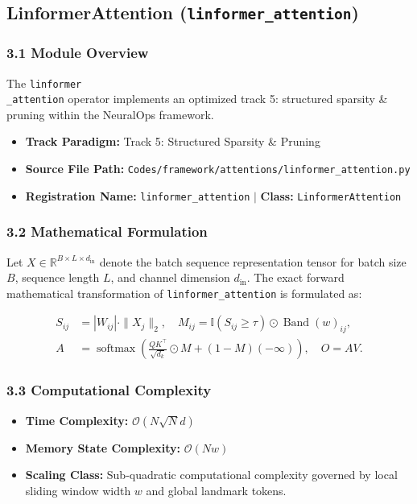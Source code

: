 \subsection{LinformerAttention (\texttt{linformer\_attention})}
\label{sec:app_module_linformer_attention}

\subsubsection*{3.1 Module Overview}
The \texttt{linformer\\_attention} operator implements an optimized track 5: structured sparsity \& pruning within the NeuralOps framework.
\begin{itemize}
    \item \textbf{Track Paradigm:} Track 5: Structured Sparsity & Pruning
    \item \textbf{Source File Path:} \texttt{Codes/framework/attentions/linformer\_attention.py}
    \item \textbf{Registration Name:} \texttt{linformer\_attention} $\mid$ \textbf{Class:} \texttt{LinformerAttention}
\end{itemize}

\subsubsection*{3.2 Mathematical Formulation}
Let $X \in \mathbb{R}^{B \times L \times d_{\text{in}}}$ denote the batch sequence representation tensor for batch size $B$, sequence length $L$, and channel dimension $d_{\text{in}}$. The exact forward mathematical transformation of \texttt{linformer\_attention} is formulated as:

\begin{align}
S_{ij} &= |W_{ij}| \cdot \|X_j\|_2, \quad M_{ij} = \mathbb{I}(S_{ij} \ge \tau) \odot \operatorname{Band}(w)_{ij}, \\
A &= \operatorname{softmax}\left(\frac{Q K^\top}{\sqrt{d_k}} \odot M + (1 - M)(-\infty)\right), \quad O = A V.
\end{align}


\subsubsection*{3.3 Computational Complexity}
\begin{itemize}
    \item \textbf{Time Complexity:} $\mathcal{O}(N \sqrt{N} d)$
    \item \textbf{Memory State Complexity:} $\mathcal{O}(N w)$
    \item \textbf{Scaling Class:} Sub-quadratic computational complexity governed by local sliding window width $w$ and global landmark tokens.
\end{itemize}

